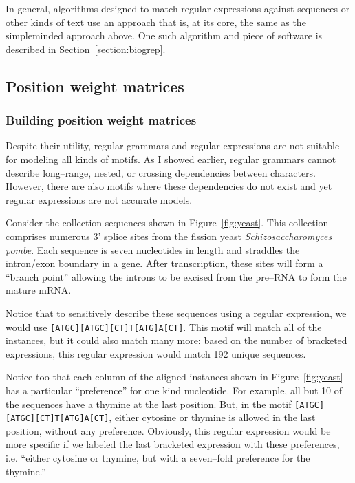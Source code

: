 In general, algorithms designed to match regular expressions against
sequences or other kinds of text use an approach that is, at its
core, the same as the simpleminded approach above.  One such
algorithm and piece of software is described in
Section~\vref{section:biogrep}.


\subsection*{Position weight matrices}\label{section:pwms}
\subsubsection*{Building position weight matrices}

    Despite their utility, regular grammars and regular expressions
    are not suitable for modeling all kinds of motifs.  As I showed
    earlier, regular grammars cannot describe long--range, nested,
    or crossing dependencies between characters.  However, there are
    also motifs where these dependencies do not exist and yet regular
    expressions are not accurate models.

    Consider the collection
    sequences shown in Figure~\vref{fig:yeast}.  This collection
    comprises numerous 3' splice sites from the fission yeast \emph{Schizosaccharomyces
    pombe}.  Each sequence is seven nucleotides in length and
    straddles the intron/exon boundary in a gene.  After
    transcription, these sites will form a ``branch point''
    allowing the introns to be excised from the pre--RNA to form the
    mature mRNA\@.

    Notice that to sensitively describe these sequences using a
    regular expression, we would use
    \texttt{[ATGC][ATGC][CT]T[ATG]A[CT]}.  This motif will match all
    of the instances, but it could also match many more: based on
    the number of bracketed expressions, this regular expression
    would match 192 unique sequences.

    Notice too that each column of the aligned instances shown
    in Figure~\ref{fig:yeast} has a particular ``preference'' for
    one kind nucleotide.  For example, all but 10 of the sequences
    have a thymine at the last position.  But, in the motif
    \texttt{[ATGC][ATGC][CT]T[ATG]A[CT]}, either cytosine or thymine
    is allowed in the last position, without any
    preference.  Obviously, this regular expression would be more
    specific if we labeled the last bracketed expression with these
    preferences, i.e. ``either cytosine or thymine, but with a
    seven--fold preference for the thymine.''


